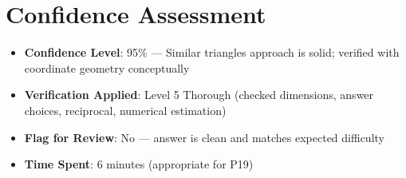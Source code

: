 \documentclass[]{article}
\begin{document}
\section*{Confidence Assessment}
\begin{itemize}[leftmargin=*]
    \item \textbf{Confidence Level}: 95\% — Similar triangles approach is solid; verified with coordinate geometry conceptually
    \item \textbf{Verification Applied}: Level 5 Thorough (checked dimensions, answer choices, reciprocal, numerical estimation)
    \item \textbf{Flag for Review}: No — answer is clean and matches expected difficulty
    \item \textbf{Time Spent}: 6 minutes (appropriate for P19)
\end{itemize}
\end{document}
